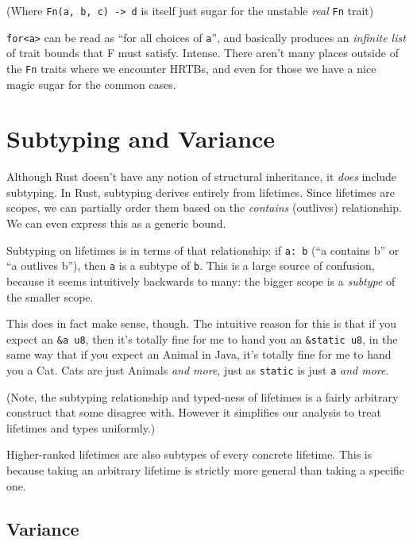 \documentclass[a4paper,]{book}
\begin{document}
(Where \texttt{Fn(a,\ b,\ c)\ -\textgreater{}\ d} is itself just sugar
for the unstable \emph{real} \texttt{Fn} trait)

\texttt{for\textless{}\textquotesingle{}a\textgreater{}} can be read as
``for all choices of \texttt{\textquotesingle{}a}'', and basically
produces an \emph{infinite list} of trait bounds that F must satisfy.
Intense. There aren't many places outside of the \texttt{Fn} traits
where we encounter HRTBs, and even for those we have a nice magic sugar
for the common cases.

\section{Subtyping and Variance}\label{sec--subtyping}

Although Rust doesn't have any notion of structural inheritance, it
\emph{does} include subtyping. In Rust, subtyping derives entirely from
lifetimes. Since lifetimes are scopes, we can partially order them based
on the \emph{contains} (outlives) relationship. We can even express this
as a generic bound.

Subtyping on lifetimes is in terms of that relationship: if
\texttt{\textquotesingle{}a:\ \textquotesingle{}b} (``a contains b'' or
``a outlives b''), then \texttt{\textquotesingle{}a} is a subtype of
\texttt{\textquotesingle{}b}. This is a large source of confusion,
because it seems intuitively backwards to many: the bigger scope is a
\emph{subtype} of the smaller scope.

This does in fact make sense, though. The intuitive reason for this is
that if you expect an \texttt{\&\textquotesingle{}a\ u8}, then it's
totally fine for me to hand you an
\texttt{\&\textquotesingle{}static\ u8}, in the same way that if you
expect an Animal in Java, it's totally fine for me to hand you a Cat.
Cats are just Animals \emph{and more}, just as
\texttt{\textquotesingle{}static} is just \texttt{\textquotesingle{}a}
\emph{and more}.

(Note, the subtyping relationship and typed-ness of lifetimes is a
fairly arbitrary construct that some disagree with. However it
simplifies our analysis to treat lifetimes and types uniformly.)

Higher-ranked lifetimes are also subtypes of every concrete lifetime.
This is because taking an arbitrary lifetime is strictly more general
than taking a specific one.

\subsection{Variance}\label{variance}
\end{document}

